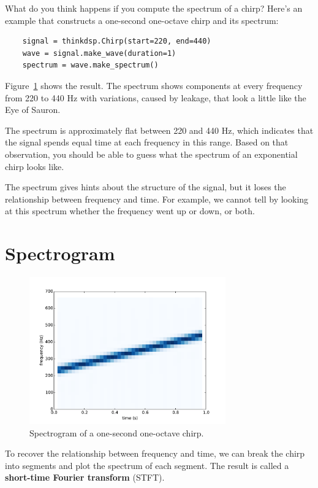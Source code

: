 \documentclass[12pt]{book}
\begin{document}
What do you think happens if you compute the spectrum of a chirp?
Here's an example that constructs a one-second one-octave chirp and
its spectrum:

\begin{verbatim}
    signal = thinkdsp.Chirp(start=220, end=440)
    wave = signal.make_wave(duration=1)
    spectrum = wave.make_spectrum()
\end{verbatim}

Figure~\ref{fig.chirp2} shows the result.  The spectrum shows
components at every frequency from 220 to 440 Hz with variations,
caused by leakage, that look a little like the Eye of Sauron.

The spectrum is approximately flat between 220 and 440 Hz, which
indicates that the signal spends equal time at each frequency in this
range.  Based on that observation, you should be able to guess what
the spectrum of an exponential chirp looks like.

The spectrum gives hints about the structure of the signal,
but it loses the relationship between frequency and time.
For example, we cannot tell by looking at this spectrum whether
the frequency went up or down, or both.


\section{Spectrogram}

\begin{figure}
\centerline{\includegraphics[height=2.5in]{figs/chirp2.pdf}}
\caption{Spectrogram of a one-second one-octave chirp.}
\label{fig.chirp2}
\end{figure}

To recover the relationship between frequency and time, we can break
the chirp into segments and plot the spectrum of each segment.  The
result is called a {\bf short-time Fourier transform} (STFT).
\end{document}
